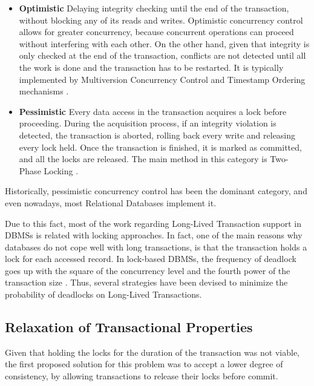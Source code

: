 \begin{itemize}

\item {\bf Optimistic} Delaying integrity checking until the end of
  the transaction, without blocking any of its reads and writes.
  Optimistic concurrency control allows for greater concurrency,
  because concurrent operations can proceed without interfering with
  each other. On the other hand, given that integrity is only checked
  at the end of the transaction, conflicts are not detected until all
  the work is done and the transaction has to be restarted. It is
  typically implemented by Multiversion Concurrency Control and
  Timestamp Ordering mechanisms \cite{Bernstein1981}.

\item {\bf Pessimistic} Every data access in the transaction acquires
  a lock before proceeding. During the acquisition process, if an
  integrity violation is detected, the transaction is aborted, rolling
  back every write and releasing every lock held. Once the transaction
  is finished, it is marked as committed, and all the locks are
  released. The main method in this category is Two-Phase Locking
  \cite{Bernstein1981}.

\end{itemize}

Historically, pessimistic concurrency control has been the dominant
category, and even nowadays, most Relational Databases implement it.

Due to this fact, most of the work regarding Long-Lived Transaction
support in DBMSs is related with locking approaches. In fact, one of
the main reasons why databases do not cope well with long
transactions, is that the transaction holds a lock for each accessed
record. In lock-based DBMSs, the frequency of deadlock goes up with
the square of the concurrency level and the fourth power of the
transaction size \cite{gray1981transaction}. Thus, several strategies
have been devised to minimize the probability of deadlocks on
Long-Lived Transactions.

\subsection{Relaxation of Transactional Properties}

Given that holding the locks for the duration of the transaction was
not viable, the first proposed solution for this problem was to accept
a lower degree of consistency, by allowing transactions to release
their locks before commit.

